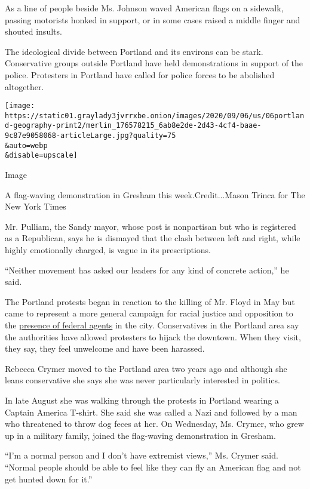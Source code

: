 As a line of people beside Ms. Johnson waved American flags on a
sidewalk, passing motorists honked in support, or in some cases raised a
middle finger and shouted insults.

The ideological divide between Portland and its environs can be stark.
Conservative groups outside Portland have held demonstrations in support
of the police. Protesters in Portland have called for police forces to
be abolished altogether.

\texttt{[image: https://static01.graylady3jvrrxbe.onion/images/2020/09/06/us/06portland-geography-print2/merlin\_176578215\_6ab8e2de-2d43-4cf4-baae-9c87e9058068-articleLarge.jpg?quality=75\\\&auto=webp\\\&disable=upscale]}

Image

A flag-waving demonstration in Gresham this week.Credit...Mason Trinca
for The New York Times

Mr. Pulliam, the Sandy mayor, whose post is nonpartisan but who is
registered as a Republican, says he is dismayed that the clash between
left and right, while highly emotionally charged, is vague in its
prescriptions.

``Neither movement has asked our leaders for any kind of concrete
action,'' he said.

The Portland protests began in reaction to the killing of Mr. Floyd in
May but came to represent a more general campaign for racial justice and
opposition to the
\href{https://www.nytimes3xbfgragh.onion/2020/07/25/us/portland-federal-legal-jurisdiction-courts.html}{presence
of federal agents} in the city. Conservatives in the Portland area say
the authorities have allowed protesters to hijack the downtown. When
they visit, they say, they feel unwelcome and have been harassed.

Rebecca Crymer moved to the Portland area two years ago and although she
leans conservative she says she was never particularly interested in
politics.

In late August she was walking through the protests in Portland wearing
a Captain America T-shirt. She said she was called a Nazi and followed
by a man who threatened to throw dog feces at her. On Wednesday, Ms.
Crymer, who grew up in a military family, joined the flag-waving
demonstration in Gresham.

``I'm a normal person and I don't have extremist views,'' Ms. Crymer
said. ``Normal people should be able to feel like they can fly an
American flag and not get hunted down for it.''

